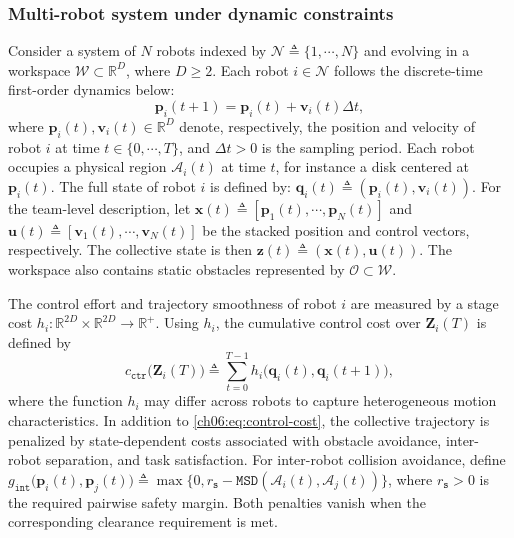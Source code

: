 \subsubsection{Multi-robot system under dynamic constraints}
\label{ch06:sec:multi-robot-system}

Consider a system of $N$ robots indexed by
$\mathcal{N} \triangleq \{1,\cdots,N\}$ and evolving in a workspace
$\mathcal{W}\subset\mathbb{R}^D$, where $D\geq 2$.
Each robot $i\in\mathcal{N}$ follows the discrete-time first-order dynamics below:
\begin{equation}
\label{ch06:eq:robot-model}
\mathbf{p}_i(t+1)=\mathbf{p}_i(t)+\mathbf{v}_i(t)\Delta t,
\end{equation}
where $\mathbf{p}_i(t),\mathbf{v}_i(t)\in\mathbb{R}^D$ denote,
respectively, the position and velocity of robot $i$ at time
$t\in\{0,\cdots,T\}$, and $\Delta t>0$ is the sampling period.
Each robot occupies a physical region $\mathcal{A}_i(t)$ at time $t$,
for instance a disk centered at $\mathbf{p}_i(t)$.
The full state of robot $i$ is defined by:
$\mathbf{q}_i(t)\triangleq (\mathbf{p}_i(t),\mathbf{v}_i(t))$.
For the team-level description, let
$\mathbf{x}(t)\triangleq [\mathbf{p}_1(t),\cdots,\mathbf{p}_N(t)]$ and
$\mathbf{u}(t)\triangleq [\mathbf{v}_1(t),\cdots,\mathbf{v}_N(t)]$
be the stacked position and control vectors, respectively.
The collective state is then
$\mathbf{z}(t)\triangleq (\mathbf{x}(t),\mathbf{u}(t))$.
The workspace also contains static obstacles represented by
$\mathcal{O}\subset\mathcal{W}$.

The control effort and trajectory smoothness of robot $i$ are measured by a
stage cost
$h_i:\mathbb{R}^{2D}\times\mathbb{R}^{2D}\rightarrow\mathbb{R}^+$.
Using $h_i$, the cumulative control cost over $\mathbf{Z}_i(T)$ is defined by
\begin{equation}
\label{ch06:eq:control-cost}
c_{\texttt{ctr}}\big(\mathbf{Z}_i(T)\big)
\triangleq \sum_{t=0}^{T-1}
h_i\big(\mathbf{q}_i(t),\mathbf{q}_i(t+1)\big),
\end{equation}
where the function $h_i$ may differ across robots to capture
heterogeneous motion characteristics.
In addition to \eqref{ch06:eq:control-cost}, the collective trajectory is
penalized by state-dependent costs associated with obstacle avoidance,
inter-robot separation, and task satisfaction.
For inter-robot collision avoidance, define
$g_{\texttt{int}}\big(\mathbf{p}_i(t),\mathbf{p}_j(t)\big)\triangleq
\max\{0,r_{\texttt{s}}-
\texttt{MSD}(\mathcal{A}_i(t),\mathcal{A}_j(t))\}$,
where $r_{\texttt{s}}>0$ is the required pairwise safety margin.
Both penalties vanish when the corresponding clearance requirement is met.


